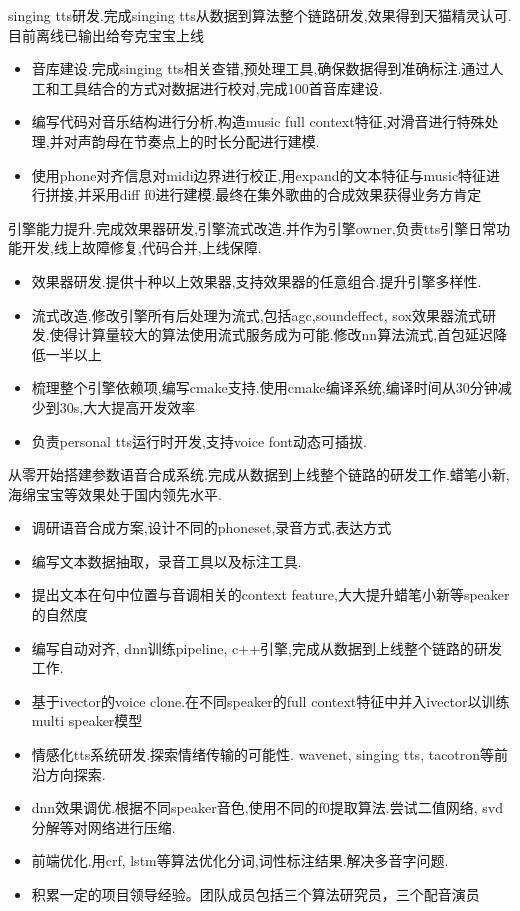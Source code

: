 \documentclass{resume}
\begin{document}
singing tts研发.完成singing tts从数据到算法整个链路研发,效果得到天猫精灵认可.目前离线已输出给夸克宝宝上线
\begin{itemize}
  \item 音库建设.完成singing tts相关查错,预处理工具,确保数据得到准确标注.通过人工和工具结合的方式对数据进行校对,完成100首音库建设.
  \item 编写代码对音乐结构进行分析,构造music full context特征,对滑音进行特殊处理,并对声韵母在节奏点上的时长分配进行建模.
  \item 使用phone对齐信息对midi边界进行校正,用expand的文本特征与music特征进行拼接,并采用diff f0进行建模.最终在集外歌曲的合成效果获得业务方肯定
\end{itemize}

引擎能力提升.完成效果器研发,引擎流式改造.并作为引擎owner,负责tts引擎日常功能开发,线上故障修复,代码合并,上线保障.
\begin{itemize}
  \item 效果器研发.提供十种以上效果器,支持效果器的任意组合.提升引擎多样性.
  \item 流式改造.修改引擎所有后处理为流式,包括agc,soundeffect, sox效果器流式研发.使得计算量较大的算法使用流式服务成为可能.修改nn算法流式,首包延迟降低一半以上
  \item 梳理整个引擎依赖项,编写cmake支持.使用cmake编译系统,编译时间从30分钟减少到30s,大大提高开发效率
  \item 负责personal tts运行时开发,支持voice font动态可插拔.
\end{itemize}

从零开始搭建参数语音合成系统.完成从数据到上线整个链路的研发工作.蜡笔小新,海绵宝宝等效果处于国内领先水平.
\begin{itemize}
  \item 调研语音合成方案,设计不同的phoneset,录音方式,表达方式
  \item 编写文本数据抽取，录音工具以及标注工具.
  \item 提出文本在句中位置与音调相关的context feature,大大提升蜡笔小新等speaker的自然度
  \item 编写自动对齐, dnn训练pipeline, c++引擎,完成从数据到上线整个链路的研发工作.
  \item 基于ivector的voice clone.在不同speaker的full context特征中并入ivector以训练multi speaker模型
  \item 情感化tts系统研发.探索情绪传输的可能性. wavenet, singing tts, tacotron等前沿方向探索.
  \item dnn效果调优.根据不同speaker音色,使用不同的f0提取算法.尝试二值网络, svd分解等对网络进行压缩.
  \item 前端优化.用crf, lstm等算法优化分词,词性标注结果.解决多音字问题.
  \item 积累一定的项目领导经验。团队成员包括三个算法研究员，三个配音演员
\end{itemize}
\end{document}
